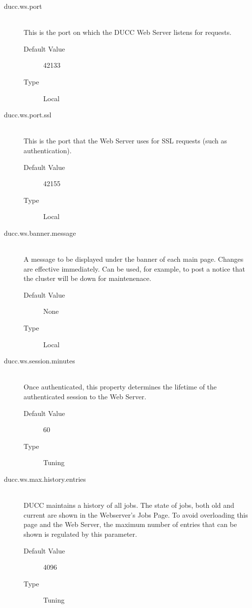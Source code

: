 \begin{description}
        \item[ducc.ws.port] \hfill \\
          This is the port on which the DUCC Web Server listens for requests. 
          \begin{description}
            \item[Default Value] 42133 
            \item[Type] Local 
          \end{description}

        \item[ducc.ws.port.ssl] \hfill \\
          This is the port that the Web Server uses for SSL requests (such as authentication). 
          \begin{description}
            \item[Default Value] 42155 
            \item[Type] Local 
          \end{description}
                    
        \item[ducc.ws.banner.message] \hfill \\
          A message to be displayed under the banner of each main page.
          Changes are effective immediately.
          Can be used, for example, to post a notice that the cluster will
          be down for maintenenace.
          \begin{description}
            \item[Default Value] None
            \item[Type] Local
          \end{description}
                              
        \item[ducc.ws.session.minutes] \hfill \\
          Once authenticated, this property determines the lifetime of the authenticated session to the 
          Web Server. 
          \begin{description}
            \item[Default Value] 60 
            \item[Type] Tuning
          \end{description}

        \item[ducc.ws.max.history.entries] \hfill \\
          DUCC maintains a history of all jobs.  The state of jobs, both old and current are shown
          in the Webserver's Jobs Page.  To avoid overloading this page and the Web Server, the maximum
          number of entries that can be shown is regulated by this parameter.
          \begin{description}
            \item[Default Value] 4096
            \item[Type] Tuning
          \end{description}


\end{description}
